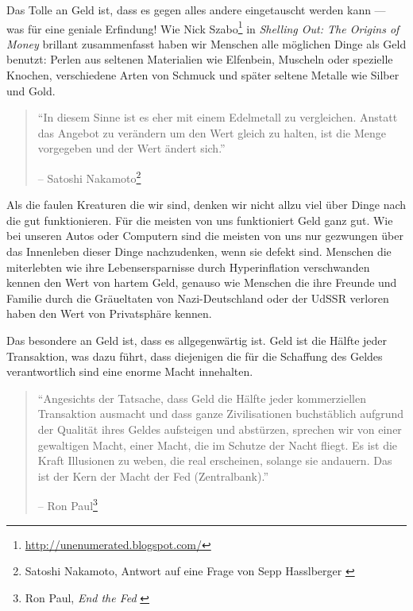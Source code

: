 Das Tolle an Geld ist, dass es gegen alles andere eingetauscht werden kann ---
was für eine geniale Erfindung! Wie Nick
Szabo\footnote{\url{http://unenumerated.blogspot.com/}} in \textit{Shelling Out:
The Origins of Money} \cite{shelling-out} brillant zusammenfasst haben wir
Menschen alle möglichen Dinge als Geld benutzt: Perlen aus seltenen Materialien
wie Elfenbein, Muscheln oder spezielle Knochen, verschiedene Arten von Schmuck
und später seltene Metalle wie Silber und Gold.

\begin{quotation}\begin{samepage}
\enquote{In diesem Sinne ist es eher mit einem Edelmetall zu vergleichen. Anstatt das Angebot zu verändern um den Wert gleich zu halten, ist die Menge vorgegeben und der Wert ändert sich.}
\begin{flushright} -- Satoshi Nakamoto\footnote{Satoshi Nakamoto, Antwort auf eine Frage von Sepp
Hasslberger \cite{satoshi-precious-metal}}
\end{flushright}\end{samepage}\end{quotation}

Als die faulen Kreaturen die wir sind, denken wir nicht allzu viel über Dinge
nach die gut funktionieren. Für die meisten von uns funktioniert Geld ganz gut.
Wie bei unseren Autos oder Computern sind die meisten von uns nur gezwungen über
das Innenleben dieser Dinge nachzudenken, wenn sie defekt sind. Menschen die
miterlebten wie ihre Lebensersparnisse durch Hyperinflation verschwanden kennen
den Wert von hartem Geld, genauso wie Menschen die ihre Freunde und Familie
durch die Gräueltaten von Nazi-Deutschland oder der UdSSR verloren haben den
Wert von Privatsphäre kennen.

Das besondere an Geld ist, dass es allgegenwärtig ist. Geld ist die Hälfte jeder
Transaktion, was dazu führt, dass diejenigen die für die Schaffung des Geldes
verantwortlich sind eine enorme Macht innehalten.

\begin{quotation}\begin{samepage}
\enquote{Angesichts der Tatsache, dass Geld die Hälfte jeder kommerziellen
Transaktion ausmacht und dass ganze Zivilisationen buchstäblich aufgrund der
Qualität ihres Geldes aufsteigen und abstürzen, sprechen wir von einer
gewaltigen Macht, einer Macht, die im Schutze der Nacht fliegt. Es ist die Kraft
Illusionen zu weben, die real erscheinen, solange sie andauern. Das ist der Kern
der Macht der Fed (Zentralbank).}
\begin{flushright} -- Ron Paul\footnote{Ron Paul, \textit{End the Fed} \cite{end-the-fed}}
\end{flushright}\end{samepage}\end{quotation}

